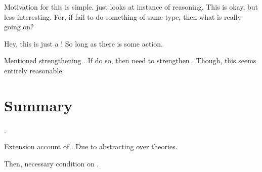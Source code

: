 \begin{note}
  Motivation for this is simple.
  \tR{} just looks at instance of reasoning.
  This is okay, but less interesting.
  For, if fail to do something of same type, then what is really going on?
\end{note}

\begin{note}
  \color{red}
  \begin{proposition}[\tC{2} and \fc{1}]
    Hey, this is just a \fc{}!
    So long as there is some action.
  \end{proposition}

  Mentioned strengthening .
  If do so, then need to strengthen \tC{}.
  Though, this seems entirely reasonable.
\end{note}


\section{Summary}
\label{cha:typical:sec:summ}

\begin{note}
  .

  Extension account of \tor{}.
  Due to abstracting over theories.

  Then, necessary condition on \tR{}.
\end{note}





